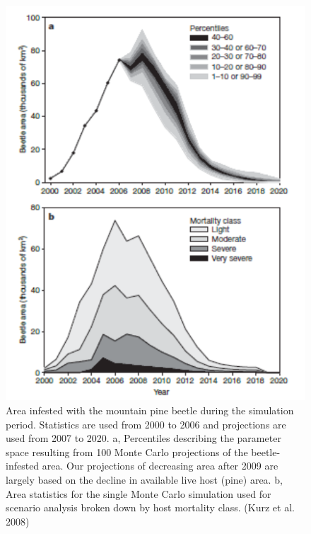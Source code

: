 \documentclass[
  12pt,
  oneside]{book}
\begin{document}
\begin{figure}

{\centering \includegraphics[width=0.8\linewidth]{figures/chap8/f811_Kurz2} 

}

\caption{Area infested with the mountain pine beetle during the simulation period. Statistics are used from 2000 to 2006 and projections are used from 2007 to 2020. a, Percentiles describing the parameter space resulting from 100 Monte Carlo projections of the beetle-infested area. Our projections of decreasing area after 2009 are largely based on the decline in available live host (pine) area. b, Area statistics for the single Monte Carlo simulation used for scenario analysis broken down by host mortality class. (Kurz et al. 2008)}\label{fig:f811}
\end{figure}
\end{document}
